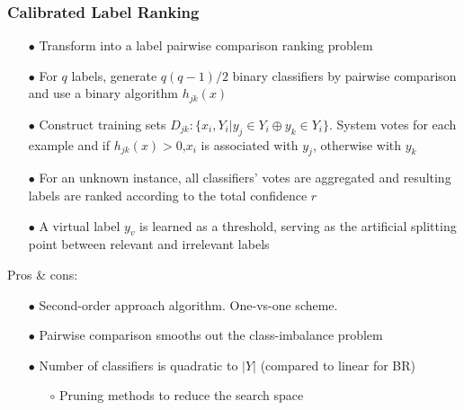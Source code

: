 \documentclass{beamer}
\begin{document}
\begin{frame}
\frametitle{Calibrated Label Ranking}
\begin{itemize}
\item[$\bullet$] Transform into a label pairwise comparison ranking problem
\item[$\bullet$] For $q$ labels, generate $q(q-1)/2$ binary classifiers by pairwise comparison and use a binary algorithm $h_{jk}(x)$
\item[$\bullet$] Construct training sets $D_{jk} : \{x_i, Y_i | y_j \in Y_i \oplus y_k \in Y_i\}$. System votes for each example and if $h_{jk}(x) >0$,$x_i$ is associated with $y_j$, otherwise with $y_k$
\item[$\bullet$] For an unknown instance, all classifiers' votes are aggregated
  and resulting labels are ranked according to the total confidence $r$
\item[$\bullet$] A virtual label $y_v$ is learned as a threshold, serving as the artificial splitting point between relevant and irrelevant labels
\end{itemize}
Pros \& cons:
\begin{itemize}
\item[$\bullet$] Second-order approach algorithm. One-vs-one scheme.
\item[$\bullet$] Pairwise comparison smooths out the class-imbalance problem
\item[$\bullet$] Number of classifiers is quadratic to $|Y|$ (compared to linear for BR)
\begin{itemize}
\item[$\circ$] Pruning methods to reduce the search space
\end{itemize}
\end{itemize}
\end{frame}
\end{document}
